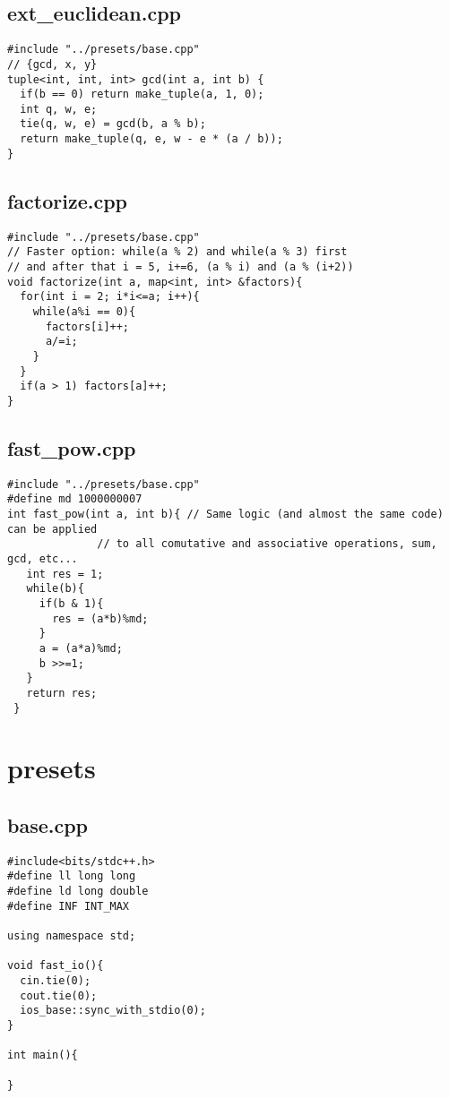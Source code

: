 \documentclass[11pt,landscape,twocolumn]{article}
\begin{document}
\subsection*{ext\_euclidean.cpp}
\begin{lstlisting}
#include "../presets/base.cpp"
// {gcd, x, y}
tuple<int, int, int> gcd(int a, int b) {
  if(b == 0) return make_tuple(a, 1, 0);
  int q, w, e;
  tie(q, w, e) = gcd(b, a % b);
  return make_tuple(q, e, w - e * (a / b));
}

\end{lstlisting}

\subsection*{factorize.cpp}
\begin{lstlisting}
#include "../presets/base.cpp"
// Faster option: while(a % 2) and while(a % 3) first
// and after that i = 5, i+=6, (a % i) and (a % (i+2))
void factorize(int a, map<int, int> &factors){
  for(int i = 2; i*i<=a; i++){
    while(a%i == 0){
      factors[i]++;
      a/=i;
    }
  }
  if(a > 1) factors[a]++;
}
\end{lstlisting}

\subsection*{fast\_pow.cpp}
\begin{lstlisting}
#include "../presets/base.cpp"
#define md 1000000007
int fast_pow(int a, int b){ // Same logic (and almost the same code) can be applied 
              // to all comutative and associative operations, sum, gcd, etc...
   int res = 1;
   while(b){
     if(b & 1){
       res = (a*b)%md;
     }
     a = (a*a)%md;
     b >>=1;
   }
   return res;
 }

\end{lstlisting}

\section{presets}
\subsection*{base.cpp}
\begin{lstlisting}
#include<bits/stdc++.h>
#define ll long long
#define ld long double
#define INF INT_MAX

using namespace std;

void fast_io(){
  cin.tie(0);
  cout.tie(0);
  ios_base::sync_with_stdio(0);
}

int main(){
  
}
\end{lstlisting}
\end{document}
